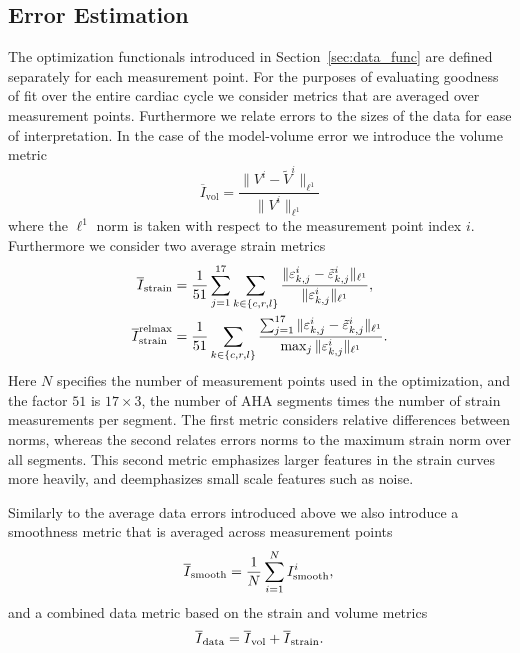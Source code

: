 \subsection{Error Estimation}

The optimization functionals introduced in Section~\ref{sec:data_func} are defined 
separately for each measurement
point. For the purposes of evaluating goodness of fit over the entire cardiac cycle
we consider metrics that are averaged over measurement points. Furthermore we 
relate errors to the sizes of the data 
for ease of interpretation. In the case of the model-volume error we introduce the volume metric
\begin{equation}
\overline{I}_{\text{vol}} = \frac{ \| V^i - \tilde{V}^i \|_{\ell^1}}{ \| V^i \|_{\ell^1}}
\label{eq:average_volume}
 \end{equation}
where the $\ell^1$ norm is taken with respect to the measurement point index $i$.
Furthermore we consider two average strain metrics
\begin{align}
\overline{I}_{\text{strain}} &= \frac{1}{51} \sum_{j= 1}^{17} \sum_{k \in \{c,r,l\}}
\frac{\| \varepsilon^i_{k,j} -  
\tilde{\varepsilon}^i_{k,j} \|_{\ell^1} }{ \| \varepsilon^i_{k,j} \|_{\ell^1}}, \\
\overline{I}^{\text{relmax}}_{\text{strain}} &=  \frac{1}{51} \sum_{k \in \{c,r,l\}}
 \frac{\sum_{j= 1}^{17} \| \varepsilon^i_{k,j} 
 -  \tilde{\varepsilon}^i_{k,j} \|_{\ell^1}}{ \max_j \| \varepsilon^i_{k,j} \|_{\ell^1}}.
\label{eq:average_strain}
\end{align}
Here $N$ specifies the number of measurement points used in the
optimization, and the factor $51$ is $17 \times 3$,
the number of AHA segments times the number of strain measurements per segment. 
The first metric considers relative differences between norms, whereas the second relates 
errors norms to the maximum
strain norm over all segments. This second metric emphasizes larger features in 
the strain curves more heavily, and deemphasizes
small scale features such as noise.

Similarly to the average data errors introduced above we also introduce a smoothness 
metric that is averaged across measurement points
\begin{equation}
\overline{I}_{\text{smooth}} = \frac{1}{N}\sum_{i = 1}^N I_{\text{smooth}}^i, \\
\end{equation}
and a combined data metric based on the strain and volume metrics
\begin{equation}
  \overline{I}_{\text{data}} = \overline{I}_{\text{vol}} + \overline{I}_{\text{strain}}.
\label{eq:total_functional}
\end{equation}

